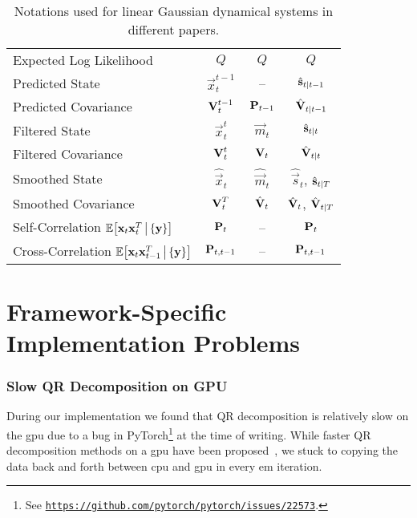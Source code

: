 \begin{table}[ht]
\begin{tabular}{l|ccc}
				Expected Log Likelihood      & \( Q \)                         & \( Q \)                 & \( Q \)                                                    \\
				Predicted State              & \( \vec{x}_t^{t - 1} \)         & --                      & \( \hat{\boldsymbol{\mathrm{s}}}_{t \vert t - 1} \)                    \\
				Predicted Covariance         & \( \boldsymbol{\mathrm{V}}_t^{t - 1} \)         & \( \boldsymbol{\mathrm{P}}_{t - 1} \)   & \( \hat{\boldsymbol{\mathrm{V}}}_{t \vert t - 1} \)                    \\
				Filtered State               & \( \vec{x}_t^t \)               & \( \vec{m}_t \)         & \( \hat{\boldsymbol{\mathrm{s}}}_{t \vert t} \)                        \\
				Filtered Covariance          & \( \boldsymbol{\mathrm{V}}_t^t \)               & \( \boldsymbol{\mathrm{V}}_t \)         & \( \hat{\boldsymbol{\mathrm{V}}}_{t \vert t} \)                        \\
				Smoothed State               & \( \hat{\vec{x}}_t \)           & \( \hat{\vec{m}}_t \)   & \( \hat{\vec{s}}_t \), \( \hat{\boldsymbol{\mathrm{s}}}_{t \vert T} \) \\
				Smoothed Covariance          & \( \boldsymbol{\mathrm{V}}_t^T \)               & \( \hat{\boldsymbol{\mathrm{V}}}_t \)   & \( \hat{\boldsymbol{\mathrm{V}}}_t \), \( \hat{\boldsymbol{\mathrm{V}}}_{t \vert T} \) \\
				Self-Correlation \( \mathbb{E}\big[\boldsymbol{\mathrm{x}}_t \boldsymbol{\mathrm{x}}_t^T \,\big\vert\, \{ \boldsymbol{\mathrm{y}} \}\big] \)
				                             & \( \boldsymbol{\mathrm{P}}_t \)                 & --                      & \( \boldsymbol{\mathrm{P}}_t \)                                            \\
				Cross-Correlation \( \mathbb{E}\big[\boldsymbol{\mathrm{x}}_t \boldsymbol{\mathrm{x}}_{t-1}^T \,\big\vert\, \{ \boldsymbol{\mathrm{y}} \}\big] \)
				                             & \( \boldsymbol{\mathrm{P}}_{t, t - 1} \)        & --                      & \( \boldsymbol{\mathrm{P}}_{t, t - 1} \)
			\end{tabular}
			\caption[Notations used for linear Gaussian dynamical systems in different papers]{Notations used for linear Gaussian dynamical systems in different papers.}
		\end{table}

	\section{Framework-Specific Implementation Problems}
		\label{app:implFrameworkProblems}

		\subsubsection{Slow QR Decomposition on GPU}
			During our implementation we found that QR decomposition is relatively slow on the \ac{gpu} due to a bug in PyTorch\footnote{See \href{https://web.archive.org/web/20201110121407/https://github.com/pytorch/pytorch/issues/22573}{\texttt{https://github.com/pytorch/pytorch/issues/22573}}.} at the time of writing. While faster QR decomposition methods on a \ac{gpu} have been proposed~\cite{andersonCommunicationAvoidingQRDecomposition2011a}, we stuck to copying the data back and forth between \ac{cpu} and \ac{gpu} in every \ac{em} iteration.

